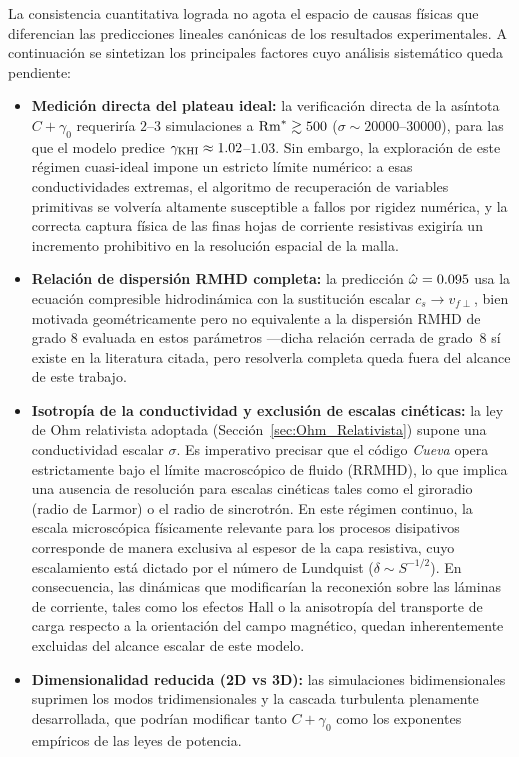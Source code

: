 \primerparrafo La consistencia cuantitativa lograda no agota el espacio de causas físicas que diferencian las predicciones lineales canónicas de los resultados experimentales. A continuación se sintetizan los principales factores cuyo análisis sistemático queda pendiente:
\begin{itemize}
\item \textbf{Medición directa del plateau ideal:} la verificación directa de la asíntota $C+\gamma_0$ requeriría $2$--$3$ simulaciones a $\mathrm{Rm}^{*}\gtrsim500$ ($\sigma\sim20000$--$30000$), para las que el modelo predice $\gamma_{\mathrm{KHI}}\approx1.02$--$1.03$. Sin embargo, la exploración de este régimen cuasi-ideal impone un estricto límite numérico: a esas conductividades extremas, el algoritmo de recuperación de variables primitivas se volvería altamente susceptible a fallos por rigidez numérica, y la correcta captura física de las finas hojas de corriente resistivas exigiría un incremento prohibitivo en la resolución espacial de la malla.
\item \textbf{Relación de dispersión RMHD completa:} la predicción $\hat{\omega}=0.095$ usa la ecuación compresible hidrodinámica con la sustitución escalar $c_s\to v_{f\perp}$, bien motivada geométricamente pero no equivalente a la dispersión RMHD de grado $8$ \parencite{osmanov-2008,chow2023} evaluada en estos parámetros ---dicha relación cerrada de grado~$8$ sí existe en la literatura citada, pero resolverla completa queda fuera del alcance de este trabajo.
\item \textbf{Isotropía de la conductividad y exclusión de escalas cinéticas:} la ley de Ohm relativista adoptada (Sección~\ref{sec:Ohm_Relativista}) supone una conductividad escalar $\sigma$. Es imperativo precisar que el código \textit{Cueva} opera estrictamente bajo el límite macroscópico de fluido (RRMHD), lo que implica una ausencia de resolución para escalas cinéticas tales como el giroradio (radio de Larmor) o el radio de sincrotrón. En este régimen continuo, la escala microscópica físicamente relevante para los procesos disipativos corresponde de manera exclusiva al espesor de la capa resistiva, cuyo escalamiento está dictado por el número de Lundquist ($\delta \sim S^{-1/2}$). En consecuencia, las dinámicas que modificarían la reconexión sobre las láminas de corriente, tales como los efectos Hall o la anisotropía del transporte de carga respecto a la orientación del campo magnético, quedan inherentemente excluidas del alcance escalar de este modelo.
\item \textbf{Dimensionalidad reducida (2D vs 3D):} las simulaciones bidimensionales suprimen los modos tridimensionales y la cascada turbulenta plenamente desarrollada, que podrían modificar tanto $C+\gamma_0$ como los exponentes empíricos de las leyes de potencia.

\end{itemize}
